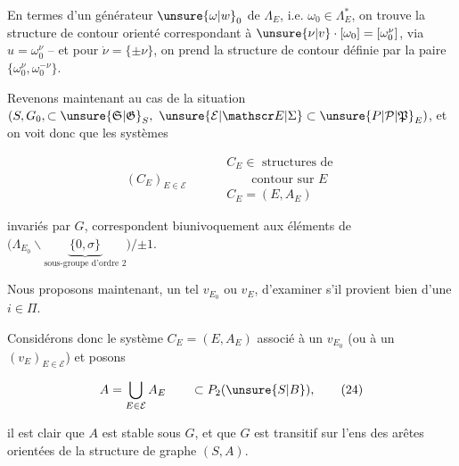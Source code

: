 
En termes d'un générateur $\unsure{\omega|w}_0$ de $\Lambda_E$,
i.e. $\omega_0\in\Lambda_E^*$, on trouve la structure de
contour orienté correspondant à $\unsure{\nu|v}\cdot[\omega_0]=[\omega_0^\nu]$,
via $u=\omega_0^\nu$ -- et pour $\dot\nu=\{\pm\nu\}$, on
prend la structure de contour définie par la
paire $\{\omega_0^\nu,\omega_0^{-\nu}\}$.

Revenons maintenant au cas de la situation
$(S,G_0,\subset\unsure{\mathfrak S|\mathfrak G}_S,\ \unsure{\mathcal E|\mathscr E|\Sigma}\subset\unsure{P|\mathcal P|\mathfrak P}_E)$, et on voit donc que les
systèmes

\[
 (C_E)_{E\in\mathcal E}\qquad
 \begin{aligned}
 &C_E\in\text{ structures de}\\
 &\hspace{2em}\text{contour sur }E\\
 &C_E=(E,A_E)
 \end{aligned}
\]

invariés par $G$, correspondent biunivoquement
aux éléments  de
$\bigl(\Lambda_{E_0}\smallsetminus\underbrace{\{0,\sigma\}}_{\text{sous-groupe d'ordre 2}}\bigr)/\mathord{\pm}1$.
 \unsure{$\ldots$}

Nous proposons maintenant,  un tel
$v_{E_0}$ ou $v_E$, d'examiner s'il provient bien
d'une  $i\in\Pi$.

Considérons donc le système 
$C_E=(E,A_E)$ associé à un $v_{E_0}$ (ou à un $(v_E)_{E\in\mathcal E}$)
et posons

\[
 A=\bigcup_{E\in\mathcal E} A_E\qquad\subset P_2(\unsure{S|B}), \tag*{(24)}
\]

il est clair que $A$ est stable sous $G$,
et que $G$ est transitif sur l'ens des
arêtes orientées de la structure de graphe $(S,A)$.


